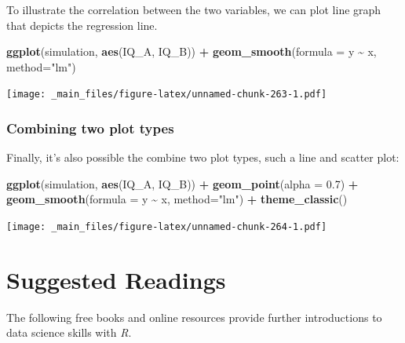 \documentclass[
]{scrartcl}
\newenvironment{Shaded}{\begin{snugshade}}{\end{snugshade}}
\newcommand{\AttributeTok}[1]{\textcolor[rgb]{0.13,0.29,0.53}{#1}}
\newcommand{\FloatTok}[1]{\textcolor[rgb]{0.00,0.00,0.81}{#1}}
\newcommand{\FunctionTok}[1]{\textcolor[rgb]{0.13,0.29,0.53}{\textbf{#1}}}
\newcommand{\NormalTok}[1]{#1}
\newcommand{\SpecialCharTok}[1]{\textcolor[rgb]{0.81,0.36,0.00}{\textbf{#1}}}
\newcommand{\StringTok}[1]{\textcolor[rgb]{0.31,0.60,0.02}{#1}}
\begin{document}
To illustrate the correlation between the two variables, we can plot line graph that depicts the regression line.

\begin{Shaded}
\begin{Highlighting}[]
\FunctionTok{ggplot}\NormalTok{(simulation, }\FunctionTok{aes}\NormalTok{(IQ\_A, IQ\_B)) }\SpecialCharTok{+}
  \FunctionTok{geom\_smooth}\NormalTok{(}\AttributeTok{formula =}\NormalTok{ y }\SpecialCharTok{\textasciitilde{}}\NormalTok{ x, }\AttributeTok{method=}\StringTok{"lm"}\NormalTok{)}
\end{Highlighting}
\end{Shaded}

\texttt{[image: \_main\_files/figure-latex/unnamed-chunk-263-1.pdf]}

\subsubsection{Combining two plot types}\label{combining-two-plot-types}

Finally, it's also possible the combine two plot types, such a line and scatter plot:

\begin{Shaded}
\begin{Highlighting}[]
\FunctionTok{ggplot}\NormalTok{(simulation, }\FunctionTok{aes}\NormalTok{(IQ\_A, IQ\_B)) }\SpecialCharTok{+}
  \FunctionTok{geom\_point}\NormalTok{(}\AttributeTok{alpha =} \FloatTok{0.7}\NormalTok{) }\SpecialCharTok{+}
  \FunctionTok{geom\_smooth}\NormalTok{(}\AttributeTok{formula =}\NormalTok{ y }\SpecialCharTok{\textasciitilde{}}\NormalTok{ x, }\AttributeTok{method=}\StringTok{"lm"}\NormalTok{) }\SpecialCharTok{+}
  \FunctionTok{theme\_classic}\NormalTok{()}
\end{Highlighting}
\end{Shaded}

\texttt{[image: \_main\_files/figure-latex/unnamed-chunk-264-1.pdf]}

\newpage

\appendix


\section{Suggested Readings}\label{readings}

The following free books and online resources provide further introductions to data science skills with \emph{R}.
\end{document}

